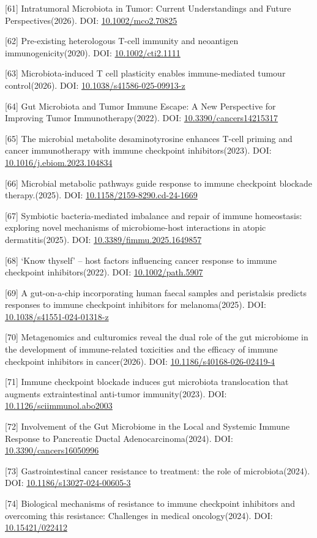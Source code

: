 {[}61{]} Intratumoral Microbiota in Tumor: Current Understandings and Future Perspectives(2026). DOI: \url{10.1002/mco2.70825}

{[}62{]} Pre-existing heterologous T-cell immunity and neoantigen immunogenicity(2020). DOI: \url{10.1002/cti2.1111}

{[}63{]} Microbiota-induced T cell plasticity enables immune-mediated tumour control(2026). DOI: \url{10.1038/s41586-025-09913-z}

{[}64{]} Gut Microbiota and Tumor Immune Escape: A New Perspective for Improving Tumor Immunotherapy(2022). DOI: \url{10.3390/cancers14215317}

{[}65{]} The microbial metabolite desaminotyrosine enhances T-cell priming and cancer immunotherapy with immune checkpoint inhibitors(2023). DOI: \url{10.1016/j.ebiom.2023.104834}

{[}66{]} Microbial metabolic pathways guide response to immune checkpoint blockade therapy.(2025). DOI: \url{10.1158/2159-8290.cd-24-1669}

{[}67{]} Symbiotic bacteria-mediated imbalance and repair of immune homeostasis: exploring novel mechanisms of microbiome-host interactions in atopic dermatitis(2025). DOI: \url{10.3389/fimmu.2025.1649857}

{[}68{]} `Know thyself' -- host factors influencing cancer response to immune checkpoint inhibitors(2022). DOI: \url{10.1002/path.5907}

{[}69{]} A gut-on-a-chip incorporating human faecal samples and peristalsis predicts responses to immune checkpoint inhibitors for melanoma(2025). DOI: \url{10.1038/s41551-024-01318-z}

{[}70{]} Metagenomics and culturomics reveal the dual role of the gut microbiome in the development of immune-related toxicities and the efficacy of immune checkpoint inhibitors in cancer(2026). DOI: \url{10.1186/s40168-026-02419-4}

{[}71{]} Immune checkpoint blockade induces gut microbiota translocation that augments extraintestinal anti-tumor immunity(2023). DOI: \url{10.1126/sciimmunol.abo2003}

{[}72{]} Involvement of the Gut Microbiome in the Local and Systemic Immune Response to Pancreatic Ductal Adenocarcinoma(2024). DOI: \url{10.3390/cancers16050996}

{[}73{]} Gastrointestinal cancer resistance to treatment: the role of microbiota(2024). DOI: \url{10.1186/s13027-024-00605-3}

{[}74{]} Biological mechanisms of resistance to immune checkpoint inhibitors and overcoming this resistance: Challenges in medical oncology(2024). DOI: \url{10.15421/022412}


